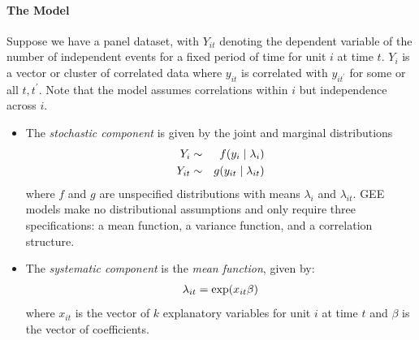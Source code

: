 \documentclass[letterpaper,10pt,english]{sphinxmanual}
\begin{document}
\paragraph{The Model}
\label{zelig-poissongee:the-model}
Suppose we have a panel dataset, with \(Y_{it}\) denoting the
dependent variable of the number of independent events for a fixed
period of time for unit \(i\) at time \(t\). \(Y_{i}\) is a
vector or cluster of correlated data where \(y_{it}\) is correlated
with \(y_{it^\prime}\) for some or all \(t, t^\prime\). Note
that the model assumes correlations within \(i\) but independence
across \(i\).
\begin{itemize}
\item {} 
The \emph{stochastic component} is given by the joint and marginal
distributions
\begin{gather}
\begin{split}\begin{aligned}
Y_{i} &\sim& f(y_{i} \mid \lambda_{i})\\
Y_{it} &\sim& g(y_{it} \mid \lambda_{it})\end{aligned}\end{split}\notag
\end{gather}
where \(f\) and \(g\) are unspecified distributions with
means \(\lambda_{i}\) and \(\lambda_{it}\). GEE models make
no distributional assumptions and only require three specifications:
a mean function, a variance function, and a correlation structure.

\item {} 
The \emph{systematic component} is the \emph{mean function}, given by:
\begin{gather}
\begin{split}\lambda_{it}  = \mathrm{exp}(x_{it} \beta)\end{split}\notag
\end{gather}
where \(x_{it}\) is the vector of \(k\) explanatory variables
for unit \(i\) at time \(t\) and \(\beta\) is the vector
of coefficients.


\end{itemize}
\end{document}
